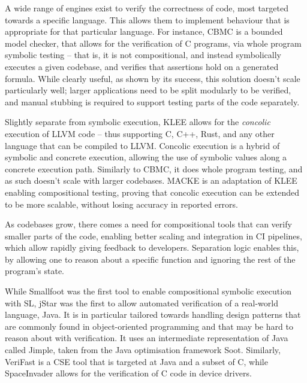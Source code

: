 A wide range of engines exist to verify the correctness of code, most targeted towards a specific language. This allows them to implement behaviour that is appropriate for that particular language.
For instance, CBMC \cite{cbmc} is a bounded model checker, that allows for the verification of C programs, via whole program symbolic testing -- that is, it is not compositional, and instead symbolically executes a given codebase, and verifies that assertions hold on a generated formula. While clearly useful, as shown by its success, this solution doesn't scale particularly well; larger applications need to be split modularly to be verified, and manual stubbing is required to support testing parts of the code separately.

Slightly separate from symbolic execution, KLEE \cite{klee} allows for the \emph{concolic} execution of LLVM code -- thus supporting C, C++, Rust, and any other language that can be compiled to LLVM. Concolic execution is a hybrid of symbolic and concrete execution, allowing the use of symbolic values along a concrete execution path. Similarly to CBMC, it does whole program testing, and as such doesn't scale with larger codebases. MACKE \cite{macke} is an adaptation of KLEE enabling compositional testing, proving that concolic execution can be extended to be more scalable, without losing accuracy in reported errors.

As codebases grow, there comes a need for compositional tools that can verify smaller parts of the code, enabling better scaling and integration in CI pipelines, which allow rapidly giving feedback to developers. Separation logic enables this, by allowing one to reason about a specific function and ignoring the rest of the program's state.

While Smallfoot \cite{smallfoot} was the first tool to enable compositional symbolic execution with SL, jStar \cite{jstar} was the first to allow automated verification of a real-world language, Java. It is in particular tailored towards handling design patterns that are commonly found in object-oriented programming and that may be hard to reason about with verification. It uses an intermediate representation of Java called Jimple, taken from the Java optimisation framework Soot. Similarly, VeriFast \cite{verifast} is a CSE tool that is targeted at Java and a subset of C, while SpaceInvader \cite{spaceinvader} allows for the verification of C code in device drivers.

